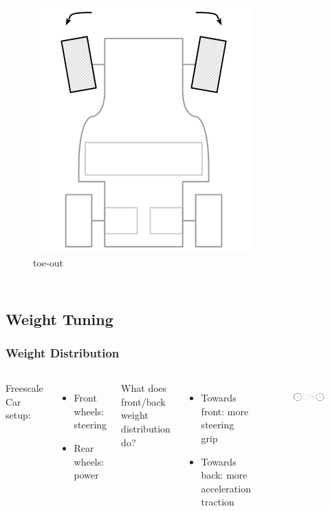 \documentclass{beamer}
\begin{document}
\begin{frame}
\begin{columns}[t]
\begin{figure}
    \vspace{\baselineskip}
    \includegraphics[scale=0.3]{images-dis12/car-top-toe-out} \\    
    toe-out
  \end{figure}
\end{columns}
\end{frame}

\subsection{Weight Tuning}

\begin{frame}
\frametitle{Weight Distribution}
\begin{columns}[t]
  Freescale Car setup:
  \begin{itemize}
    \item Front wheels: steering
    \item Rear wheels: power
  \end{itemize}
  \vspace{\baselineskip}
  What does front/back weight distribution do?
   {
  \begin{itemize}
    \item Towards front: more steering grip
    \item Towards back: more acceleration traction
  \end{itemize}
  }
  \begin{figure}
    \centering
    \includegraphics[scale=0.3]{images-dis12/car-side} \\
  \end{figure}
\end{columns}
\end{frame}
\end{document}
